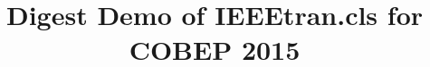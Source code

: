 \documentclass[letterpaper,oneside,onecolumn,draftclsnofoot,12pt,conference]{IEEEtran}
\begin{document}
%
\title{Digest Demo of IEEEtran.cls \cite{IEEEhowto:IEEEtranpage} for COBEP 2015}




% 
\end{document}
